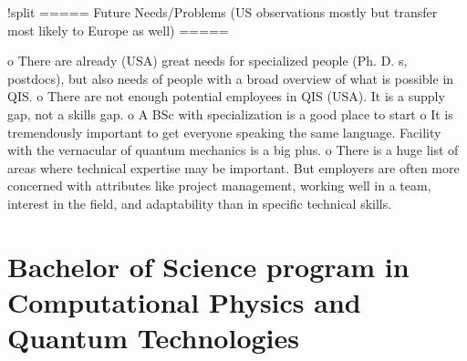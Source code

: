 \documentclass[oneside,final,10pt]{article}
\begin{document}
!split
===== Future Needs/Problems (US observations mostly but transfer most likely to Europe as well) =====

o There are already (USA) great needs for specialized people (Ph. D. s, postdocs), but also needs of  people with a broad overview of what is possible in QIS.
o There are not enough potential employees in QIS (USA). It is a supply gap, not a skills gap.
o A BSc with specialization  is a good place to start
o It is tremendously important to get everyone speaking the same language. Facility with the vernacular of quantum mechanics is a big plus.
o There is a huge list of areas where technical expertise may be important. But employers are often more concerned with attributes like project management, working well in a team, interest in the field, and adaptability than in specific technical skills.


\section*{Bachelor of Science program in Computational Physics and Quantum Technologies}
\end{document}
